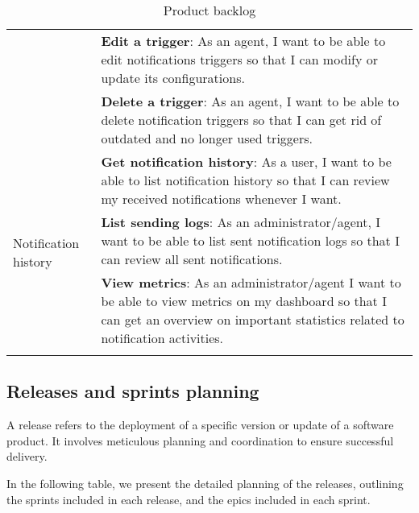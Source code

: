 \begin{longtable}{ | m{}  | m{} | }
      \cline{2-2}
                                                              & \textbf{Edit a trigger}: As an agent, I want to be able to edit notifications triggers so that I can modify or update its configurations.                                                    \\
      \cline{2-2}
                                                              & \textbf{Delete a trigger}: As an agent, I want to be able to delete notification triggers so that I can get rid of outdated and no longer used triggers.                                     \\
      \hline
      \multirow[t]{4}{5em}{Notification history}              & \textbf{Get notification history}: As a user, I want to be able to list notification history so that I can review my received notifications whenever I want.                                 \\
      \cline{2-2}
                                                              & \textbf{List sending logs}: As an administrator/agent, I want to be able to list sent notification logs so that I can review all sent notifications.                                         \\
      \hline
      Dashboard                                               & \textbf{View metrics}: As an administrator/agent I want to be able to view metrics on my dashboard so that I can get an overview on important statistics related to notification activities. \\
      \hline
      \caption{Product backlog}
\end{longtable}

\subsection{Releases and sprints planning}
A release refers to the deployment of a specific version or update of a software product. It involves meticulous planning
and coordination to ensure successful delivery.

In the following table, we present the detailed planning of the releases, outlining the sprints included in each release,
and the epics included in each sprint. \\

